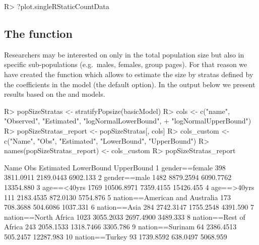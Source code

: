 \documentclass[
]{jss}
\newcommand{\1}{\mathcal{I}} \newcommand{\bZero}{\boldsymbol{0}}
\begin{document}
\begin{CodeChunk}
\begin{CodeInput}
R> ?plot.singleRStaticCountData
\end{CodeInput}
\end{CodeChunk}

\subsection[The stratifyPopsize function]{The  function}

Researchers may be interested on only in the total population size but
also in specific sub-populations (e.g.~males, females, group pages). For
that reason we have created the  function which
allows to estimate the size by stratas defined by the coefficients in
the model (the default option). In the output below we present results
based on the  and  models.

\begin{CodeChunk}
\begin{CodeInput}
R> popSizeStratas <- stratifyPopsize(basicModel)
R> cols <- c("name", "Observed", "Estimated", "logNormalLowerBound", 
+           "logNormalUpperBound")
R> popSizeStratas_report <- popSizeStratas[, cols]
R> cols_custom <- c("Name", "Obs", "Estimated", "LowerBound", "UpperBound")
R> names(popSizeStratas_report) <- cols_custom
R> popSizeStratas_report
\end{CodeInput}
\begin{CodeOutput}
                             Name  Obs  Estimated LowerBound UpperBound
1                  gender==female  398  3811.0911  2189.0443   6902.133
2                    gender==male 1482  8879.2594  6090.7762  13354.880
3                     age==<40yrs 1769 10506.8971  7359.4155  15426.455
4                     age==>40yrs  111  2183.4535   872.0130   5754.876
5  nation==American and Australia  173   708.3688   504.6086   1037.331
6                    nation==Asia  284  2742.3147  1755.2548   4391.590
7            nation==North Africa 1023  3055.2033  2697.4900   3489.333
8          nation==Rest of Africa  243  2058.1533  1318.7466   3305.786
9                 nation==Surinam   64  2386.4513   505.2457  12287.983
10                 nation==Turkey   93  1739.8592   638.0497   5068.959
\end{CodeOutput}
\end{CodeChunk}
\end{document}
